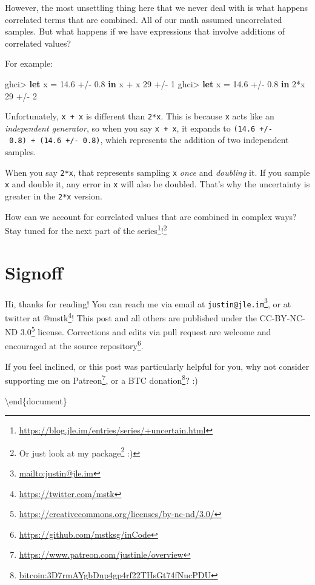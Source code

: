 \documentclass[]{article}
\newenvironment{Shaded}{}{}
\newcommand{\DecValTok}[1]{\textcolor[rgb]{0.25,0.63,0.44}{#1}}
\newcommand{\FloatTok}[1]{\textcolor[rgb]{0.25,0.63,0.44}{#1}}
\newcommand{\KeywordTok}[1]{\textcolor[rgb]{0.00,0.44,0.13}{\textbf{#1}}}
\newcommand{\NormalTok}[1]{#1}
\newcommand{\OperatorTok}[1]{\textcolor[rgb]{0.40,0.40,0.40}{#1}}
\newcommand{\OtherTok}[1]{\textcolor[rgb]{0.00,0.44,0.13}{#1}}
\renewcommand{\href}[2]{#2\footnote{\url{#1}}}
\begin{document}
However, the most unsettling thing here that we never deal with is what happens
correlated terms that are combined. All of our math assumed uncorrelated
samples. But what happens if we have expressions that involve additions of
correlated values?

For example:

\begin{Shaded}
\begin{Highlighting}[]
\NormalTok{ghci}\OperatorTok{\textgreater{}} \KeywordTok{let}\NormalTok{ x }\OtherTok{=} \FloatTok{14.6} \OperatorTok{+/{-}} \FloatTok{0.8} \KeywordTok{in}\NormalTok{ x }\OperatorTok{+}\NormalTok{ x}
\DecValTok{29} \OperatorTok{+/{-}} \DecValTok{1}
\NormalTok{ghci}\OperatorTok{\textgreater{}} \KeywordTok{let}\NormalTok{ x }\OtherTok{=} \FloatTok{14.6} \OperatorTok{+/{-}} \FloatTok{0.8} \KeywordTok{in} \DecValTok{2}\OperatorTok{*}\NormalTok{x}
\DecValTok{29} \OperatorTok{+/{-}} \DecValTok{2}
\end{Highlighting}
\end{Shaded}

Unfortunately, \texttt{x\ +\ x} is different than \texttt{2*x}. This is because
\texttt{x} acts like an \emph{independent generator}, so when you say
\texttt{x\ +\ x}, it expands to \texttt{(14.6\ +/-\ 0.8)\ +\ (14.6\ +/-\ 0.8)},
which represents the addition of two independent samples.

When you say \texttt{2*x}, that represents sampling \texttt{x} \emph{once} and
\emph{doubling} it. If you sample \texttt{x} and double it, any error in
\texttt{x} will also be doubled. That's why the uncertainty is greater in the
\texttt{2*x} version.

How can we account for correlated values that are combined in complex ways? Stay
tuned for the next part of the
\href{https://blog.jle.im/entries/series/+uncertain.html}{series}!\footnote{Or
  just look at my \href{https://hackage.haskell.org/package/uncertain}{package}
  :)}

\section{Signoff}\label{signoff}

Hi, thanks for reading! You can reach me via email at
\href{mailto:justin@jle.im}{\nolinkurl{justin@jle.im}}, or at twitter at
\href{https://twitter.com/mstk}{@mstk}! This post and all others are published
under the \href{https://creativecommons.org/licenses/by-nc-nd/3.0/}{CC-BY-NC-ND
3.0} license. Corrections and edits via pull request are welcome and encouraged
at \href{https://github.com/mstksg/inCode}{the source repository}.

If you feel inclined, or this post was particularly helpful for you, why not
consider \href{https://www.patreon.com/justinle/overview}{supporting me on
Patreon}, or a \href{bitcoin:3D7rmAYgbDnp4gp4rf22THsGt74fNucPDU}{BTC donation}?
:)

\textbackslash end\{document\}
\end{document}

